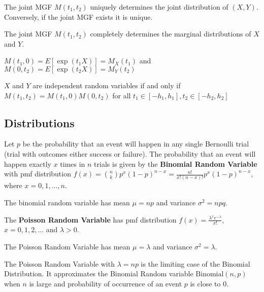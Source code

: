 \begin{thm}
    The joint MGF $M(t_1, t_2)$ uniquely determines the joint distribution of $(X, Y)$.
    Conversely, if the joint MGF exists it is unique.
\end{thm}

\begin{thm}
    The joint MGF $M(t_1, t_2)$ completely determines the marginal distributions of $X$ and $Y$.

    $M(t_1, 0) = E[\exp(t_1 X)] = M_X (t_1)$ and $M(0, t_2) = E[\exp(t_2 X)] = M_Y(t_2)$
\end{thm}

\begin{thm}
    $X$ and $Y$ are independent random variables if and only if $M(t_1, t_2) = M(t_1, 0) M(0, t_2)$ for all $t_1 \in [-h_1, h_1], t_2 \in [-h_2, h_2]$
\end{thm}


\hhrule
\subsection*{Distributions}

\begin{defn}
    Let $p$ be the probability that an event will happen in any single Bernoulli trial (trial with outcomes either success or failure). The probability that an event will happen exactly $x$ times in $n$ trials is given by the \textbf{Binomial Random Variable} with pmf distribution $f(x) = {n \choose k} p^x (1-p)^{n-x} = \displaystyle \frac{n!}{x! (n-x)!} p^x (1-p)^{n-x}$, where $x = 0, 1, ... , n$.
\end{defn}

\begin{prop}
The binomial random variable has mean $\mu = np$ and variance $\sigma^2 = npq$.
\end{prop}

\begin{defn}
    The \textbf{Poisson Random Variable} has pmf distribution $f(x) = \displaystyle \frac{\lambda^x e^{-\lambda}}{x!}$, $x = 0, 1, 2, ...$ and $\lambda > 0$.
\end{defn}

\begin{prop}
The Poisson Random Variable has mean $\mu = \lambda$ and variance $\sigma^2 = \lambda$.
\end{prop}
\begin{prop}
    The Poisson Random Variable with $\lambda = np$ is the limiting case of the Binomial Distribution. It approximates the Binomial Random variable $\text{Binomial}(n,p)$ when $n$ is large and probability of occurrence of an event $p$ is close to $0$.
\end{prop}

